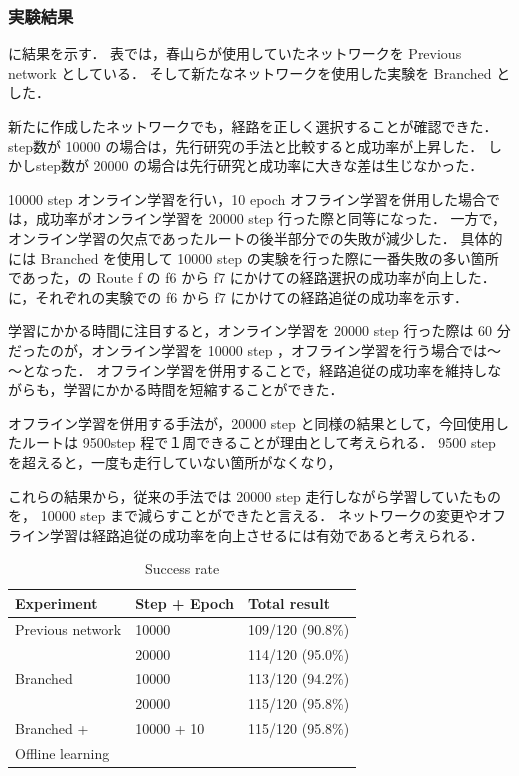 \clearpage
\subsubsection{実験結果}
に結果を示す．
表では，春山らが使用していたネットワークを Previous network としている．
そして新たなネットワークを使用した実験を Branched とした．

新たに作成したネットワークでも，経路を正しく選択することが確認できた．
step数が 10000 の場合は，先行研究の手法と比較すると成功率が上昇した．
しかしstep数が 20000 の場合は先行研究と成功率に大きな差は生じなかった．

10000 step オンライン学習を行い，10 epoch オフライン学習を併用した場合では，成功率がオンライン学習を 20000 step 行った際と同等になった．
一方で，オンライン学習の欠点であったルートの後半部分での失敗が減少した．
具体的には Branched を使用して 10000 step の実験を行った際に一番失敗の多い箇所であった，の Route f の f6 から f7 にかけての経路選択の成功率が向上した．
に，それぞれの実験での f6 から f7 にかけての経路追従の成功率を示す．

学習にかかる時間に注目すると，オンライン学習を 20000 step 行った際は 60 分だったのが，オンライン学習を 10000 step ，オフライン学習を行う場合では～～となった．
オフライン学習を併用することで，経路追従の成功率を維持しながらも，学習にかかる時間を短縮することができた．

オフライン学習を併用する手法が，20000 step と同様の結果として，今回使用したルートは 9500step 程で１周できることが理由として考えられる．
9500 step　を超えると，一度も走行していない箇所がなくなり，

これらの結果から，従来の手法では 20000 step 走行しながら学習していたものを， 10000 step まで減らすことができたと言える．
ネットワークの変更やオフライン学習は経路追従の成功率を向上させるには有効であると考えられる．

\begin{table}[]
  \centering
  \caption{Success rate}
  \begin{tabular}{lll}
  \hline
  Experiment        & Step + Epoch & Total result     \\ \hline
  Previous network  & 10000        & 109/120 (90.8\%) \\
                    & 20000        & 114/120 (95.0\%) \\ \hline
  Branched          & 10000        & 113/120 (94.2\%) \\ 
                    & 20000        & 115/120 (95.8\%) \\ \hline
  Branched +        & 10000 + 10   & 115/120 (95.8\%) \\ 
  Offline learning  &              &                  \\ \hline
  \end{tabular}
  \label{tab:result}
\end{table}

